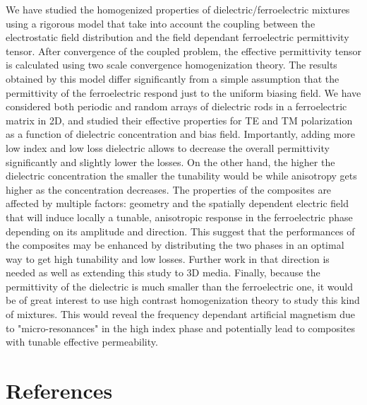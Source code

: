 \documentclass[%
 reprint,
 amsmath,amssymb,
 aps,
]{revtex4-2}
\begin{document}
We have studied the homogenized properties of dielectric/ferroelectric mixtures
using a rigorous model that take into account the coupling between the electrostatic
field distribution and the field dependant ferroelectric permittivity tensor. After
convergence of the coupled problem, the effective permittivity tensor is calculated using
two scale convergence homogenization theory.
The results obtained by this model differ significantly from a simple assumption that
the permittivity of the ferroelectric respond just to the uniform biasing field.
We have considered both periodic and random arrays
of dielectric rods in a ferroelectric matrix in 2D, and studied their effective properties
for TE and TM polarization as a function of dielectric concentration and bias field.
Importantly, adding more low index and low loss dielectric allows to decrease
the overall permittivity significantly and slightly lower the losses. On the other hand,
the higher the dielectric concentration the smaller the tunability would be while
anisotropy gets higher as the concentration decreases.
The properties of the composites are affected by multiple factors:
 geometry and the spatially dependent electric field that will induce locally a tunable, anisotropic
 response in the ferroelectric phase depending on its amplitude and direction.
 This suggest that the performances of the composites
 may be enhanced by distributing the two phases in an optimal way to get high
  tunability and low losses. Further work in that direction is needed as well as
  extending this study to 3D media.
 Finally, because the permittivity of the dielectric is much smaller than the ferroelectric one,
 it would be of great interest to use high contrast homogenization theory
 \cite{BOUCHITTE2004377, cherednichenko_cooper_2015} to
 study this kind of mixtures.
 This would reveal the frequency dependant artificial magnetism due to "micro-resonances"
 in the high index phase and potentially lead to composites with tunable effective permeability.


%
%


\section*{References}
% 

\end{document}
